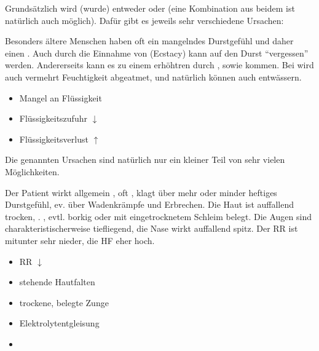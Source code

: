 {%
Grundsätzlich wird (wurde) entweder  oder  (eine Kombination aus beidem ist natürlich auch
möglich). Dafür gibt es jeweils sehr verschiedene Ursachen:

Besonders ältere Menschen haben oft ein mangelndes
Durstgefühl und daher einen . Auch durch die
Einnahme von  (Ecstacy) kann auf den Durst
\enquote{vergessen} werden.
Andererseits kann es zu einem erhöhtren
 durch , 
sowie  kommen. Bei  wird
auch vermehrt Feuchtigkeit abgeatmet, und natürlich können
auch  entwässern.
}{
\begin{itemize} %
  \item Mangel an Flüssigkeit
  \item Flüssigkeitszufuhr ${\downarrow}$
  \item Flüssigkeitsverlust ${\uparrow}$
\end{itemize}
}{}{}{}

Die genannten Ursachen sind natürlich nur ein kleiner Teil
von sehr vielen Möglichkeiten.

\TextSlide{\TxSymptome}
{%
Der Patient wirkt allgemein , oft
, klagt über mehr oder minder heftiges
Durstgefühl, ev. über Wadenkrämpfe und Erbrechen. Die Haut
ist auffallend trocken, . , evtl.
borkig oder mit eingetrocknetem Schleim belegt. Die Augen
sind charakteristischerweise tiefliegend, die Nase wirkt
auffallend spitz. Der RR ist mitunter sehr nieder, die HF
eher hoch. 
}{
\begin{itemize}
    \item RR ${\downarrow}$
    \item stehende Hautfalten
    \item trockene, belegte Zunge
    \item Elektrolytentgleisung
    \item {}
\end{itemize}
}{}{}{}



